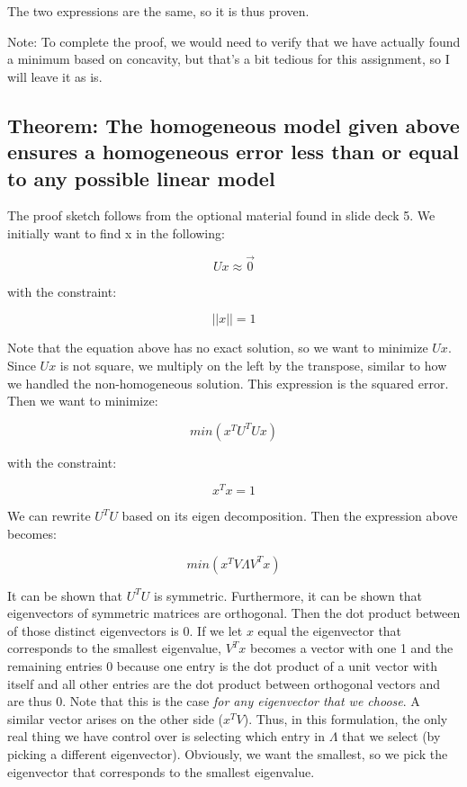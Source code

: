 \documentclass{article}
\begin{document}
The two expressions are the same, so it is thus proven.

Note: To complete the proof, we would need to verify that we have actually found a minimum 
based on concavity, but that's a bit tedious for this assignment, so I will 
leave it as is.

\subsection{Theorem: The homogeneous model given above ensures a homogeneous error less than or equal to any possible linear model}

The proof sketch follows from the optional material found in slide deck 5. We 
initially want to find x in the following:

$$
U x \approx \overrightarrow{0}
$$

with the constraint:

$$
|| x || = 1
$$

Note that the equation above has no exact solution, so we want to minimize 
$ U x $. Since $ U x $ is not square, we multiply on the left by the transpose, similar 
to how we handled the non-homogeneous solution. This expression is the squared 
error. Then we want to minimize:

$$
min(x^T U^T U x)
$$

with the constraint:

$$
x^T x = 1
$$

We can rewrite $U^T U$ based on its eigen decomposition. Then the expression 
above becomes:

$$
min(x^T V \Lambda V^T x)
$$

It can be shown that $ U^T U $ is symmetric. Furthermore, it can be shown that 
eigenvectors of symmetric matrices are orthogonal. Then the dot product between 
of those distinct eigenvectors is 0. If we let $x$ equal the eigenvector that 
corresponds to the smallest eigenvalue, $V^T x$ becomes a vector with one 1 and 
the remaining entries 0 because one 
entry is the dot product of a unit vector with itself and all other entries are the dot 
product between orthogonal vectors and are thus 0. Note that this is the case 
\textit{for any eigenvector that we choose}. A similar vector arises on the 
other side ($x^T V$). Thus, in this formulation, the only real thing we have 
control over is selecting 
which entry in $\Lambda$ that we select (by picking a different eigenvector). 
Obviously, we want the smallest, so we pick the eigenvector that corresponds to 
the smallest eigenvalue.
\end{document}
